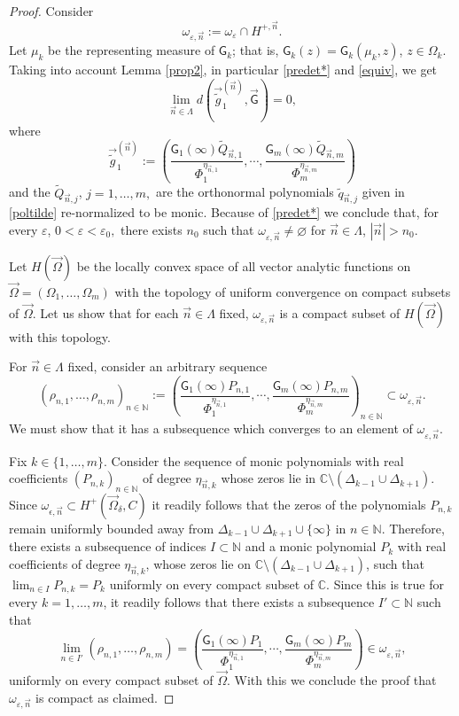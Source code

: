 \documentclass{amsart}
\numberwithin{equation}{section}
\theoremstyle{definition}
\newcommand{\n}{\vec{n}}          %
\begin{document}
\begin{proof}
 	Consider
 	\[
 	\omega_{\varepsilon,\n} := \omega_\varepsilon \cap H^{+,\n}.
 	\]
 	Let $\mu_k$ be the representing measure of $\mathsf{G}_k$; that is, $\mathsf{G}_k(z) = \mathsf{G}_k(\mu_k,z)$, $z\in\Omega_k$. Taking into account Lemma \ref{prop2}, in particular \eqref{predet*} and \eqref{equiv}, we get
 	\[
 	\lim_{\n\in\Lambda} d(\vec{\tilde{g}}_1^{(\n)},\vec{\mathsf{G}}) = 0,
 	\]
 	where
 	\[
 	\vec{\tilde{g}}_1^{(\n)} := \left(\frac{\mathsf{G}_1(\infty)\tilde{Q}_{\n,1}}{\Phi_1^{\eta_{\n,1}}}, \cdots, \frac{\mathsf{G}_m(\infty)\tilde{Q}_{\n,m}}{\Phi_m^{\eta_{\n,m}}}\right)
 	\]
 and the $\tilde{Q}_{\n,j}$, $j=1,\ldots,m,$ are the orthonormal polynomials $\tilde{q}_{\n,j}$
 given in \eqref{poltilde} re-normalized to be monic. Because of \eqref{predet*} we conclude that, for every $\varepsilon$, $0<\varepsilon<\varepsilon_0,$ there exists $n_0$ such that $\omega_{\varepsilon,\n}\neq\varnothing$ for $\n\in\Lambda$, $|\n|>n_0$.


Let  $H(\vec{\Omega})$ be the locally convex space  of all vector analytic functions on $\vec{\Omega} = (\Omega_1, \ldots,\Omega_m)$ with the topology of uniform convergence on compact subsets of $\vec{\Omega}$.
 Let us show that for each $\n \in \Lambda$ fixed, $\omega_{\varepsilon,\n}$ is a compact subset of $H(\vec{\Omega})$ with this topology.

 For $\n \in \Lambda$ fixed, consider an arbitrary sequence
 \[  (\rho_{n,1} ,\ldots,\rho_{n,m} )_{n \in \mathbb{N}} := \left(\frac{\mathsf{G}_1(\infty) {P}_{n,1}}{\Phi_1^{\eta_{\n,1}}}, \cdots, \frac{\mathsf{G}_m(\infty) {P}_{n,m}}{\Phi_m^{\eta_{\n,m}}}\right)_{n \in \mathbb{N}}
 \subset \omega_{\varepsilon,\n}.
 \]
 We must show that it has a subsequence which converges to an element of $\omega_{\varepsilon,\n}$.


Fix $k \in \{1,\ldots,m\}$.   Consider the sequence of monic polynomials  with real coefficients  $(P_{n,k})_{n\in \mathbb{N}}$ of degree $\eta_{\n,k}$ whose zeros lie in $ \mathbb{C} \setminus (\Delta_{k-1} \cup \Delta_{k+1})$. Since $\omega_{ \epsilon,\n} \subset H^+(\vec{\Omega}_{\delta},C)$ it readily follows that the zeros of the polynomials $P_{n,k}$
remain uniformly bounded away from $\Delta_{k-1} \cup \Delta_{k+1} \cup \{\infty\}$ in $n\in \mathbb{N}$.
Therefore, there exists a subsequence of indices $I \subset \mathbb{N}$ and a monic polynomial $P_k$ with real coefficients of degree $\eta_{\n,k}$, whose zeros lie on $\mathbb{C} \setminus (\Delta_{k-1} \cup \Delta_{k+1})$, such that $\lim_{n \in I} P_{n,k} = P_k$ uniformly on every compact subset of $\mathbb{C}$.  Since this is true for every $k = 1,\ldots,m$, it readily follows that there exists a subsequence $I' \subset \mathbb{N}$ such that
\[ \lim_{n \in I'}  (\rho_{n,1},\ldots,\rho_{n,m}) = \left(\frac{\mathsf{G}_1(\infty) {P}_{1}}{\Phi_1^{\eta_{\n,1}}}, \cdots, \frac{\mathsf{G}_m(\infty) {P}_{m}}{\Phi_m^{\eta_{\n,m}}}\right) \in  \omega_{\varepsilon,\n},
\]
uniformly on every compact subset of $\vec{\Omega}$.   With this we conclude the proof that $\omega_{\varepsilon,\n}$ is compact as claimed.


\end{proof}
\end{document}
